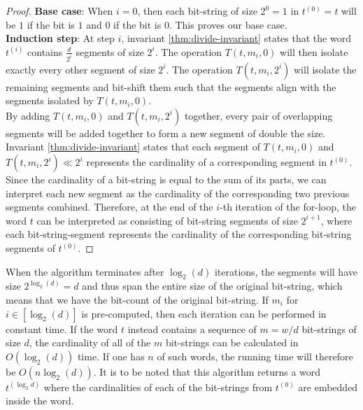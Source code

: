 \begin{proof}
    \textbf{Base case}: When $i=0$, then each bit-string of size $2^0=1$ in $t^{(0)} = t$ will be $1$ if the bit is $1$ and $0$ if the bit is $0$. This proves our base case. \\
    \textbf{Induction step}:
    At step $i$, invariant \ref{thm:divide-invariant} states that the word $t^{(i)}$ contains $\frac{d}{2^i}$ segments of size $2^i$. The operation $T(t, m_i, 0)$ will then isolate exactly every other segment of size $2^i$. The operation $T(t, m_i, 2^i)$ will isolate the remaining segments and bit-shift them such that the segments align with the segments isolated by $T(t, m_i, 0)$.\\
    By adding $T(t, m_i, 0)$ and $T(t, m_i, 2^i)$ together, every pair of overlapping segments will be added together to form a new segment of double the size. Invariant \ref{thm:divide-invariant} states that each segment of $T(t, m_i, 0)$ and $T(t, m_i, 2^i) \ll 2^i$ represents the cardinality of a corresponding segment in $t^{(0)}$. Since the cardinality of a bit-string is equal to the sum of its parts, we can interpret each new segment as the cardinality of the corresponding two previous segments combined. Therefore, at the end of the $i$-th iteration of the for-loop, the word $t$ can be interpreted as consisting of bit-string segments of size $2^{i+1}$, where each bit-string-segment represents the cardinality of the corresponding bit-string segments of $t^{(0)}$.
\end{proof}
When the algorithm terminates after $\log_2(d)$ iterations, the segments will have size $2^{\log_2{(d)}} = d$ and thus span the entire size of the original bit-string, which means that we have the bit-count of the original bit-string. If $m_{i}$ for $i\in [\log_2{(d)}]$ is pre-computed, then each iteration can be performed in constant time.
If the word $t$ instead contains a sequence of $m=w/d$ bit-strings of size $d$, the cardinality of all of the $m$ bit-strings can be calculated in $O(\log_2{(d)})$ time.
If one has $n$ of such words, the running time will therefore be $O(n\log_2{(d)})$.
It is to be noted that this algorithm returns a word $t^{(\log_2{d})}$ where the cardinalities of each of the bit-strings from $t^{(0)}$ are embedded inside the word.
